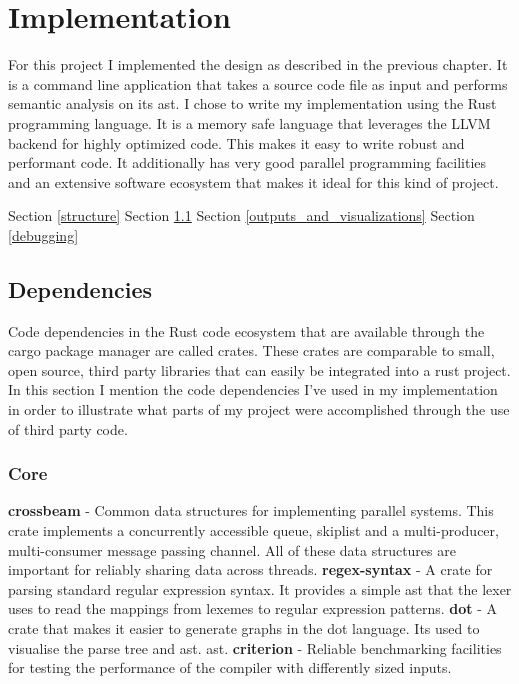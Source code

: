 \chapter{Implementation} \label{implementation}

For this project I implemented the design as described in the previous chapter.
It is a command line application that takes a source code file as input and
performs semantic analysis on its \gls{ast}. I chose to write my implementation
using the Rust programming language. It is a memory safe language that leverages
the LLVM backend for highly optimized code. This makes it easy to write
robust and performant code. It additionally has very good parallel programming
facilities and an extensive software ecosystem that makes it ideal for this kind
of project. 




Section \ref{structure}
\newline \newline
Section \ref{dependancies}
\newline \newline
Section \ref{outputs_and_visualizations}
\newline \newline
Section \ref{debugging}

\section{Dependencies} \label{dependancies}

Code dependencies in the Rust code ecosystem that are  available through the
cargo package manager are called crates. These crates are comparable to small,
open source, third party libraries that can easily be integrated into a rust
project. In this section I mention the code dependencies I've used in my
implementation in order to illustrate what parts of my project were accomplished
through the use of third party code.

\subsection{Core}

\textbf{crossbeam} - Common data structures for implementing parallel systems.
This crate implements a concurrently accessible queue, skiplist and a
multi-producer, multi-consumer message passing channel. All of these data
structures are important for reliably sharing data across threads.
\newline\newline
\textbf{regex-syntax} - A crate for parsing standard regular expression syntax.
It provides a simple \gls{ast} that the lexer uses to read the mappings from
lexemes to regular expression patterns.
\newline\newline
\textbf{dot} - A crate that makes it easier to generate graphs in the dot
language. Its used to visualise the parse tree and \gls{ast}.
\gls{ast}.
\newline\newline
\textbf{criterion} - Reliable benchmarking facilities for testing the performance of the
compiler with differently sized inputs.

